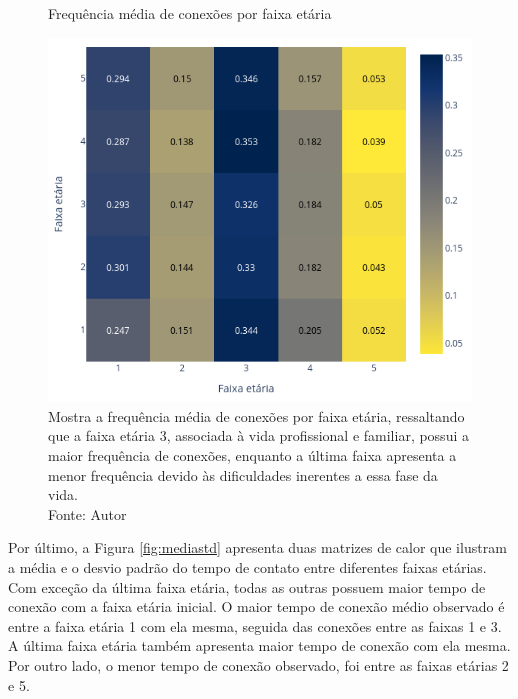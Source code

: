 \begin{figure}[H]
    \centering
    \captionsetup{font=normalsize,skip=0.8pt,singlelinecheck=on,labelsep=endash}
    \caption{Frequência média de conexões por faixa etária}
    \includegraphics[scale= 0.5]{figuras/h-PIF.png}
    \captionsetup{font=small,justification=justified}
    \caption*{Mostra a frequência média de conexões por faixa etária, ressaltando que a faixa etária 3, associada à vida profissional e familiar, possui a maior frequência de conexões, enquanto a última faixa apresenta a menor frequência devido às dificuldades inerentes a essa fase da vida. \\Fonte: Autor}
    \label{fig:heat}
\end{figure}

Por último, a Figura \ref{fig:mediastd} apresenta duas matrizes de calor que ilustram a média e o desvio padrão do tempo de contato entre diferentes faixas etárias. 
Com exceção da última faixa etária, todas as outras possuem maior tempo de conexão com a faixa etária inicial. O maior tempo de conexão médio observado é entre a faixa etária 1 com ela mesma, seguida das conexões entre as faixas 1 e 3. A última faixa etária também apresenta maior tempo de conexão com ela mesma. Por outro lado, o menor tempo de conexão observado, foi entre as faixas etárias 2 e 5.


